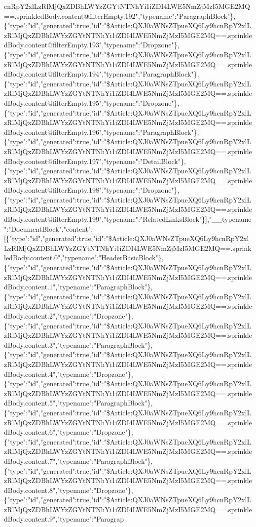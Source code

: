 cnRpY2xlLzRlMjQxZDBhLWYzZGYtNTNhYi1iZDI4LWE5NmZjMzI5MGE2MQ==.sprinkledBody.content@filterEmpty.192","typename":"ParagraphBlock"\},\{"type":"id","generated":true,"id":"\$Article:QXJ0aWNsZTpueXQ6Ly9hcnRpY2xlLzRlMjQxZDBhLWYzZGYtNTNhYi1iZDI4LWE5NmZjMzI5MGE2MQ==.sprinkledBody.content@filterEmpty.193","typename":"Dropzone"\},\{"type":"id","generated":true,"id":"\$Article:QXJ0aWNsZTpueXQ6Ly9hcnRpY2xlLzRlMjQxZDBhLWYzZGYtNTNhYi1iZDI4LWE5NmZjMzI5MGE2MQ==.sprinkledBody.content@filterEmpty.194","typename":"ParagraphBlock"\},\{"type":"id","generated":true,"id":"\$Article:QXJ0aWNsZTpueXQ6Ly9hcnRpY2xlLzRlMjQxZDBhLWYzZGYtNTNhYi1iZDI4LWE5NmZjMzI5MGE2MQ==.sprinkledBody.content@filterEmpty.195","typename":"Dropzone"\},\{"type":"id","generated":true,"id":"\$Article:QXJ0aWNsZTpueXQ6Ly9hcnRpY2xlLzRlMjQxZDBhLWYzZGYtNTNhYi1iZDI4LWE5NmZjMzI5MGE2MQ==.sprinkledBody.content@filterEmpty.196","typename":"ParagraphBlock"\},\{"type":"id","generated":true,"id":"\$Article:QXJ0aWNsZTpueXQ6Ly9hcnRpY2xlLzRlMjQxZDBhLWYzZGYtNTNhYi1iZDI4LWE5NmZjMzI5MGE2MQ==.sprinkledBody.content@filterEmpty.197","typename":"DetailBlock"\},\{"type":"id","generated":true,"id":"\$Article:QXJ0aWNsZTpueXQ6Ly9hcnRpY2xlLzRlMjQxZDBhLWYzZGYtNTNhYi1iZDI4LWE5NmZjMzI5MGE2MQ==.sprinkledBody.content@filterEmpty.198","typename":"Dropzone"\},\{"type":"id","generated":true,"id":"\$Article:QXJ0aWNsZTpueXQ6Ly9hcnRpY2xlLzRlMjQxZDBhLWYzZGYtNTNhYi1iZDI4LWE5NmZjMzI5MGE2MQ==.sprinkledBody.content@filterEmpty.199","typename":"RelatedLinksBlock"\}{]},"\_\_typename":"DocumentBlock","content":{[}\{"type":"id","generated":true,"id":"\$Article:QXJ0aWNsZTpueXQ6Ly9hcnRpY2xlLzRlMjQxZDBhLWYzZGYtNTNhYi1iZDI4LWE5NmZjMzI5MGE2MQ==.sprinkledBody.content.0","typename":"HeaderBasicBlock"\},\{"type":"id","generated":true,"id":"\$Article:QXJ0aWNsZTpueXQ6Ly9hcnRpY2xlLzRlMjQxZDBhLWYzZGYtNTNhYi1iZDI4LWE5NmZjMzI5MGE2MQ==.sprinkledBody.content.1","typename":"ParagraphBlock"\},\{"type":"id","generated":true,"id":"\$Article:QXJ0aWNsZTpueXQ6Ly9hcnRpY2xlLzRlMjQxZDBhLWYzZGYtNTNhYi1iZDI4LWE5NmZjMzI5MGE2MQ==.sprinkledBody.content.2","typename":"Dropzone"\},\{"type":"id","generated":true,"id":"\$Article:QXJ0aWNsZTpueXQ6Ly9hcnRpY2xlLzRlMjQxZDBhLWYzZGYtNTNhYi1iZDI4LWE5NmZjMzI5MGE2MQ==.sprinkledBody.content.3","typename":"ParagraphBlock"\},\{"type":"id","generated":true,"id":"\$Article:QXJ0aWNsZTpueXQ6Ly9hcnRpY2xlLzRlMjQxZDBhLWYzZGYtNTNhYi1iZDI4LWE5NmZjMzI5MGE2MQ==.sprinkledBody.content.4","typename":"Dropzone"\},\{"type":"id","generated":true,"id":"\$Article:QXJ0aWNsZTpueXQ6Ly9hcnRpY2xlLzRlMjQxZDBhLWYzZGYtNTNhYi1iZDI4LWE5NmZjMzI5MGE2MQ==.sprinkledBody.content.5","typename":"ParagraphBlock"\},\{"type":"id","generated":true,"id":"\$Article:QXJ0aWNsZTpueXQ6Ly9hcnRpY2xlLzRlMjQxZDBhLWYzZGYtNTNhYi1iZDI4LWE5NmZjMzI5MGE2MQ==.sprinkledBody.content.6","typename":"Dropzone"\},\{"type":"id","generated":true,"id":"\$Article:QXJ0aWNsZTpueXQ6Ly9hcnRpY2xlLzRlMjQxZDBhLWYzZGYtNTNhYi1iZDI4LWE5NmZjMzI5MGE2MQ==.sprinkledBody.content.7","typename":"ParagraphBlock"\},\{"type":"id","generated":true,"id":"\$Article:QXJ0aWNsZTpueXQ6Ly9hcnRpY2xlLzRlMjQxZDBhLWYzZGYtNTNhYi1iZDI4LWE5NmZjMzI5MGE2MQ==.sprinkledBody.content.8","typename":"Dropzone"\},\{"type":"id","generated":true,"id":"\$Article:QXJ0aWNsZTpueXQ6Ly9hcnRpY2xlLzRlMjQxZDBhLWYzZGYtNTNhYi1iZDI4LWE5NmZjMzI5MGE2MQ==.sprinkledBody.content.9","typename":"Paragrap
